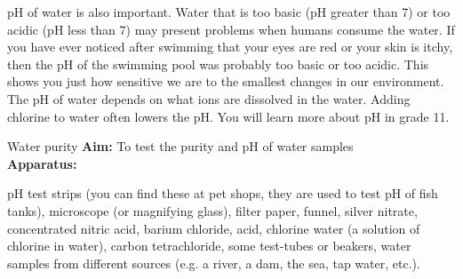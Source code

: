 pH of water is also important. Water that is too basic (pH greater than 7) or too acidic (pH less than 7) may present problems when humans consume the water. If you have ever noticed after swimming that your eyes are red or your skin is itchy, then the pH of the swimming pool was probably too basic or too acidic. This shows you just how sensitive we are to the smallest changes in our environment. The pH of water depends on what ions are dissolved in the water. Adding chlorine to water often lowers the pH. You will learn more about pH in grade 11. 
\par 
\label{m38138*id08321}
            \begin{g_experiment}{Water purity}
            \nopagebreak
            \label{m38138*id08341}\noindent{}\textbf{Aim:}\newline
To test the purity and pH of water samples
\\
\label{m38138*id083244}\noindent{}\textbf{Apparatus:}\\
\begin{minipage}{.5\textwidth}
pH test strips (you can find these at pet shops, they are used to test pH of fish tanks), microscope (or magnifying glass), filter paper, funnel, silver nitrate, concentrated nitric acid, barium chloride, acid, chlorine water (a solution of chlorine in water), carbon tetrachloride, some test-tubes or beakers, water samples from different sources (e.g. a river, a dam, the sea, tap water, etc.).
\end{minipage}
\begin{minipage}{.5\textwidth}


\end{minipage}
\end{g_experiment}
